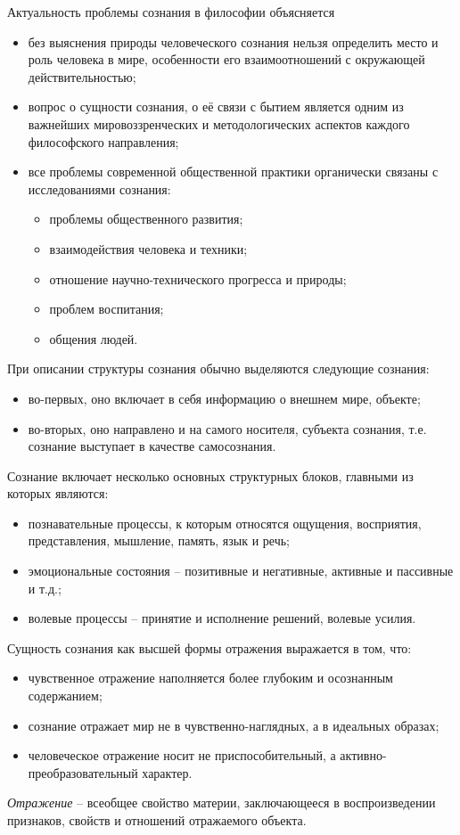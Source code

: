
Актуальность проблемы сознания в философии объясняется
\begin{itemize}
    \item без выяснения природы человеческого сознания нельзя определить место и роль человека в мире, 
        особенности его взаимоотношений с окружающей действительностью;
    \item вопрос о сущности сознания, о её связи с бытием является одним из важнейших мировоззренческих и 
        методологических аспектов каждого философского направления;
    \item все проблемы современной общественной практики органически связаны с исследованиями сознания:
    \begin{itemize}
        \item проблемы общественного развития;
        \item взаимодействия человека и техники;
        \item отношение научно-технического прогресса и природы;
        \item проблем воспитания;
        \item общения людей.
    \end{itemize}
\end{itemize}

При описании структуры сознания обычно выделяются следующие сознания:
\begin{itemize}
    \item во-первых, оно включает в себя информацию о внешнем мире, объекте;
    \item во-вторых, оно направлено и на самого носителя, субъекта сознания, т.е. сознание выступает в 
        качестве самосознания.
\end{itemize}

Сознание включает несколько основных структурных блоков, главными из которых являются:
\begin{itemize}
    \item познавательные процессы, к которым относятся ощущения, восприятия, представления, мышление, 
        память, язык и речь;
    \item эмоциональные состояния -- позитивные и негативные, активные и пассивные и т.д.;
    \item волевые процессы -- принятие и исполнение решений, волевые усилия.
\end{itemize}

Сущность сознания как высшей формы отражения выражается в том, что:
\begin{itemize}
    \item чувственное отражение наполняется более глубоким и осознанным содержанием;
    \item сознание отражает мир не в чувственно-наглядных, а в идеальных образах;
    \item человеческое отражение носит не приспособительный, а активно-преобразовательный характер.
\end{itemize}

\emph{Отражение} -- всеобщее свойство материи, заключающееся в воспроизведении признаков, свойств и 
отношений отражаемого объекта. 